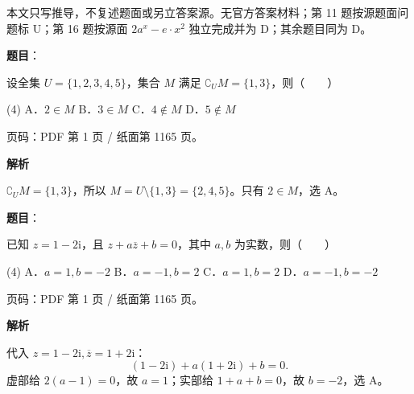 

\begin{gktip}
本文只写推导，不复述题面或另立答案源。无官方答案材料；第 11 题按源题面问题标 U；第 16 题按源面 $2a^x-e\cdot x^2$ 独立完成并为 D；其余题目同为 D。
\end{gktip}

\begin{answer}

\textbf{题目}：

设全集 $U=\{1,2,3,4,5\}$，集合 $M$ 满足 $\complement_U M=\{1,3\}$，则\mbox{（　　）}

\begin{gkopts}(4)
\task A．$2\in M$
\task B．$3\in M$
\task C．$4\notin M$
\task D．$5\notin M$
\end{gkopts}

\begin{gktip}
页码：PDF 第 1 页 / 纸面第 1165 页。
\end{gktip}

\textbf{解析}

$\complement_U M=\{1,3\}$，所以 $M=U\setminus\{1,3\}=\{2,4,5\}$。只有 $2\in M$，选 A。


\end{answer}
\begin{answer}

\textbf{题目}：

已知 $z=1-2\mathrm i$，且 $z+a\overline z+b=0$，其中 $a,b$ 为实数，则\mbox{（　　）}

\begin{gkopts}(4)
\task A．$a=1,b=-2$
\task B．$a=-1,b=2$
\task C．$a=1,b=2$
\task D．$a=-1,b=-2$
\end{gkopts}

\begin{gktip}
页码：PDF 第 1 页 / 纸面第 1165 页。
\end{gktip}

\textbf{解析}

代入 $z=1-2\mathrm i,\overline z=1+2\mathrm i$：
\nopagebreak[4]
\[
(1-2\mathrm i)+a(1+2\mathrm i)+b=0.
\]
虚部给 $2(a-1)=0$，故 $a=1$；实部给 $1+a+b=0$，故 $b=-2$，选 A。


\end{answer}
